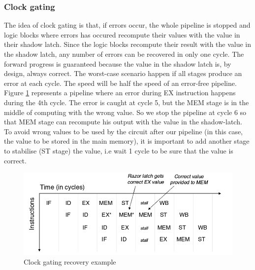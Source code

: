 \documentclass[fleqn,envcountsame,runningheads,10pt,a4paper]{llncs}
\begin{document}
\subsubsection{Clock gating}
The idea of clock gating is that, if errors occur, the whole pipeline is
stopped and logic blocks where errors has occured recompute their values
with the value in their shadow latch. Since the logic blocks recompute their result with the value in the shadow latch, any number of errors can be recovered in only one cycle. The forward progress is guaranteed because the value in the shadow latch is, by design, always correct. The worst-case scenario happen if all stages produce an error at each cycle. The speed will be half the speed of an error-free pipeline. 
Figure \ref{figure4} represents a pipeline where an error during EX
instruction happens during the 4th cycle. The error is caught at cycle 5, but the MEM stage is in the middle of computing with the wrong value. So we stop the pipeline at cycle 6 so that MEM stage can recompute his output with the value in the shadow-latch. To avoid wrong values to be used by the circuit after our pipeline (in this case, the value to be stored in the main memory), it is important to add another stage to stabilise (ST stage) the value, i.e wait 1 cycle to be sure that the value is correct. 
\begin{figure}[!h]
    \centering
   \centerline{\includegraphics[scale=0.3]{./img/figure4.png}}
   \caption{\label{figure4}Clock gating recovery example\cite{Barthou:1998}}
\end{figure}
\end{document}
